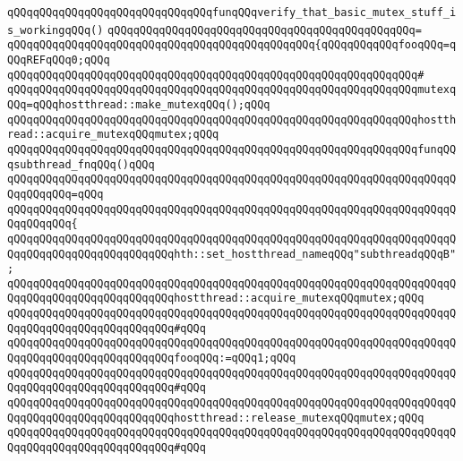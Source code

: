 \verb|qQQqqQQqqQQqqQQqqQQqqQQqqQQqqQQqfunqQQqverify_that_basic_mutex_stuff_is_workingqQQq()|\newline
\verb|qQQqqQQqqQQqqQQqqQQqqQQqqQQqqQQqqQQqqQQqqQQqqQQq=|\newline
\verb|qQQqqQQqqQQqqQQqqQQqqQQqqQQqqQQqqQQqqQQqqQQqqQQq{qQQqqQQqqQQqfooqQQq=qQQqREFqQQq0;qQQq|\newline
\verb|qQQqqQQqqQQqqQQqqQQqqQQqqQQqqQQqqQQqqQQqqQQqqQQqqQQqqQQqqQQqqQQq#|\newline
\verb|qQQqqQQqqQQqqQQqqQQqqQQqqQQqqQQqqQQqqQQqqQQqqQQqqQQqqQQqqQQqqQQqmutexqQQq=qQQqhostthread::make_mutexqQQq();qQQq|\newline
\newline
\verb|qQQqqQQqqQQqqQQqqQQqqQQqqQQqqQQqqQQqqQQqqQQqqQQqqQQqqQQqqQQqqQQqhostthread::acquire_mutexqQQqmutex;qQQq|\newline
\newline
\verb|qQQqqQQqqQQqqQQqqQQqqQQqqQQqqQQqqQQqqQQqqQQqqQQqqQQqqQQqqQQqqQQqfunqQQqsubthread_fnqQQq()qQQq|\newline
\verb|qQQqqQQqqQQqqQQqqQQqqQQqqQQqqQQqqQQqqQQqqQQqqQQqqQQqqQQqqQQqqQQqqQQqqQQqqQQqqQQq=qQQq|\newline
\verb|qQQqqQQqqQQqqQQqqQQqqQQqqQQqqQQqqQQqqQQqqQQqqQQqqQQqqQQqqQQqqQQqqQQqqQQqqQQqqQQq{|\newline
\verb|qQQqqQQqqQQqqQQqqQQqqQQqqQQqqQQqqQQqqQQqqQQqqQQqqQQqqQQqqQQqqQQqqQQqqQQqqQQqqQQqqQQqqQQqqQQqqQQqhth::set_hostthread_nameqQQq"subthreadqQQqB";|\newline
\newline
\verb|qQQqqQQqqQQqqQQqqQQqqQQqqQQqqQQqqQQqqQQqqQQqqQQqqQQqqQQqqQQqqQQqqQQqqQQqqQQqqQQqqQQqqQQqqQQqqQQqhostthread::acquire_mutexqQQqmutex;qQQq|\newline
\verb|qQQqqQQqqQQqqQQqqQQqqQQqqQQqqQQqqQQqqQQqqQQqqQQqqQQqqQQqqQQqqQQqqQQqqQQqqQQqqQQqqQQqqQQqqQQqqQQq#qQQq|\newline
\verb|qQQqqQQqqQQqqQQqqQQqqQQqqQQqqQQqqQQqqQQqqQQqqQQqqQQqqQQqqQQqqQQqqQQqqQQqqQQqqQQqqQQqqQQqqQQqqQQqfooqQQq:=qQQq1;qQQq|\newline
\verb|qQQqqQQqqQQqqQQqqQQqqQQqqQQqqQQqqQQqqQQqqQQqqQQqqQQqqQQqqQQqqQQqqQQqqQQqqQQqqQQqqQQqqQQqqQQqqQQq#qQQq|\newline
\verb|qQQqqQQqqQQqqQQqqQQqqQQqqQQqqQQqqQQqqQQqqQQqqQQqqQQqqQQqqQQqqQQqqQQqqQQqqQQqqQQqqQQqqQQqqQQqqQQqhostthread::release_mutexqQQqmutex;qQQq|\newline
\verb|qQQqqQQqqQQqqQQqqQQqqQQqqQQqqQQqqQQqqQQqqQQqqQQqqQQqqQQqqQQqqQQqqQQqqQQqqQQqqQQqqQQqqQQqqQQqqQQq#qQQq|\newline
